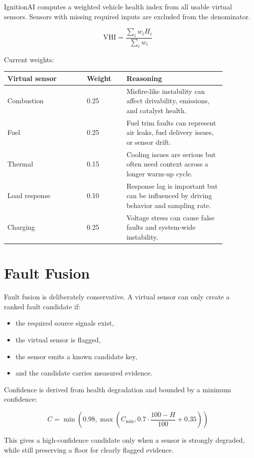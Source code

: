 \documentclass[11pt,a4paper]{article}
\begin{document}
IgnitionAI computes a weighted vehicle health index from all usable virtual sensors. Sensors with missing required inputs are excluded from the denominator.

\[
\mathrm{VHI} = \frac{\sum_i w_i H_i}{\sum_i w_i}
\]

Current weights:

\begin{longtable}{L{0.32\linewidth}L{0.16\linewidth}L{0.40\linewidth}}
\toprule
\textbf{Virtual sensor} & \textbf{Weight} & \textbf{Reasoning} \\
\midrule
Combustion & 0.25 & Misfire-like instability can affect drivability, emissions, and catalyst health. \\
Fuel & 0.25 & Fuel trim faults can represent air leaks, fuel delivery issues, or sensor drift. \\
Thermal & 0.15 & Cooling issues are serious but often need context across a longer warm-up cycle. \\
Load response & 0.10 & Response lag is important but can be influenced by driving behavior and sampling rate. \\
Charging & 0.25 & Voltage stress can cause false faults and system-wide instability. \\
\bottomrule
\end{longtable}

\section{Fault Fusion}

Fault fusion is deliberately conservative. A virtual sensor can only create a ranked fault candidate if:

\begin{itemize}
\item the required source signals exist,
\item the virtual sensor is flagged,
\item the sensor emits a known candidate key,
\item and the candidate carries measured evidence.
\end{itemize}

Confidence is derived from health degradation and bounded by a minimum confidence:

\[
C = \min(0.98, \max(C_{\min}, 0.7 \cdot \frac{100-H}{100} + 0.35))
\]

This gives a high-confidence candidate only when a sensor is strongly degraded, while still preserving a floor for clearly flagged evidence.
\end{document}
